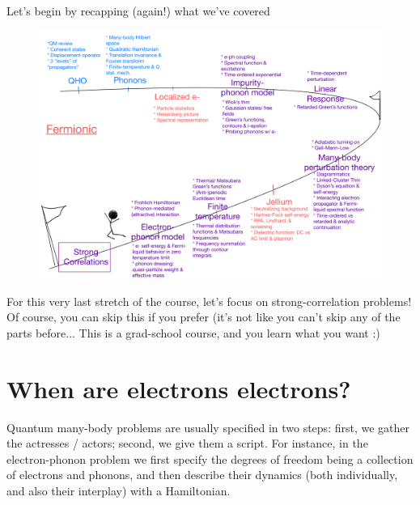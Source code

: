 Let's begin by recapping (again!) what we've covered
\begin{figure}[H]
    \centering
    \includegraphics[width=\textwidth]{jupyterbook/data/fig/lec25-fig00.png}
\end{figure}
For this very last stretch of the course, let's focus on strong-correlation problems! Of course, you can skip this if you prefer (it's not like you can't skip any of the parts before... This is a grad-school course, and you learn what you want :)

\section{When are electrons electrons?}

Quantum many-body problems are usually specified in two steps: first, we gather the actresses / actors; second, we give them a script. For instance, in the electron-phonon problem we first specify the degrees of freedom being a collection of electrons and phonons, and then describe their dynamics (both individually, and also their interplay) with a Hamiltonian.

